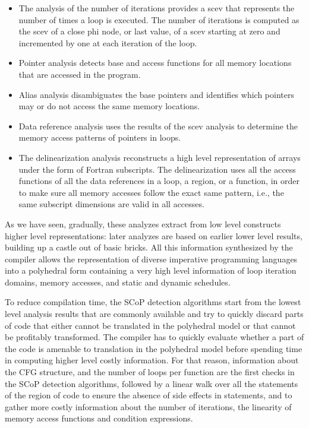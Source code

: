 \documentclass{sigplanconf}
\begin{document}
\begin{itemize}
\item The analysis of the number of iterations \cite{scev} provides a scev that
  represents the number of times a loop is executed.  The number of iterations
  is computed as the scev of a close phi node, or last value, of a scev starting
  at zero and incremented by one at each iteration of the loop.

\item Pointer analysis detects base and access functions for all memory
  locations that are accessed in the program.

\item Alias analysis disambiguates the base pointers and identifies which
  pointers may or do not access the same memory locations.

\item Data reference analysis uses the results of the scev analysis to determine
  the memory access patterns of pointers in loops.

\item The delinearization analysis \cite{delinearization1, delinearization2}
  reconstructs a high level representation of arrays under the form of Fortran
  subscripts.  The delinearization uses all the access functions of all the data
  references in a loop, a region, or a function, in order to make sure all
  memory accesses follow the exact same pattern, i.e., the same subscript
  dimensions are valid in all accesses.
\end{itemize}

As we have seen, gradually, these analyzes extract from low level constructs
higher level representations: later analyzes are based on earlier lower level
results, building up a castle out of basic bricks.  All this information
synthesized by the compiler allows the representation of diverse imperative
programming languages into a polyhedral form \cite{Girbal} containing a very
high level information of loop iteration domains, memory accesses, and static
and dynamic schedules.

To reduce compilation time, the SCoP detection algorithms start from the lowest
level analysis results that are commonly available and try to quickly discard
parts of code that either cannot be translated in the polyhedral model or that
cannot be profitably transformed.  The compiler has to quickly evaluate whether
a part of the code is amenable to translation in the polyhedral model before
spending time in computing higher level costly information.  For that reason,
information about the CFG structure, and the number of loops per function are
the first checks in the SCoP detection algorithms, followed by a linear walk
over all the statements of the region of code to ensure the absence of side
effects in statements, and to gather more costly information about the number of
iterations, the linearity of memory access functions and condition expressions.
\end{document}
